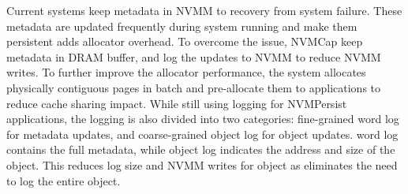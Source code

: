 Current systems keep metadata in NVMM to recovery from system failure.
These metadata are updated frequently during system running and make
them persistent adds allocator overhead. To overcome the issue, NVMCap
keep metadata in DRAM buffer, and log the updates to NVMM to reduce NVMM
writes. To further improve the allocator performance, the system allocates
physically contiguous pages in batch and pre-allocate them to applications 
to reduce cache sharing impact. While still using logging for NVMPersist
applications, the logging is also divided into two categories: fine-grained
word log for metadata updates, and coarse-grained object log for object
updates. word log contains the full metadata, while object log indicates
the address and size of the object. This reduces log size and NVMM writes for
object as eliminates the need to log the entire object.
